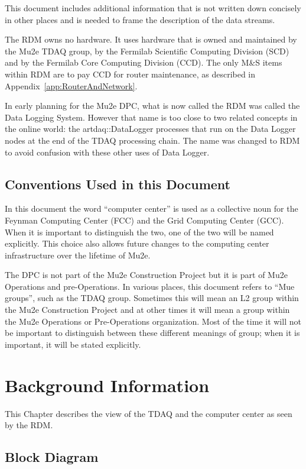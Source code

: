 This document includes additional information that is not written down concisely
in other places and is needed to frame the description of the data streams.


The RDM owns no hardware.  It uses hardware that is owned and maintained
by the Mu2e TDAQ group,
by the Fermilab Scientific Computing Division (SCD)
and by the Fermilab Core Computing Division (CCD).
The only M\&S items within RDM are to pay CCD for router maintenance,
as described in Appendix~\ref{app:RouterAndNetwork}.

In early planning for the Mu2e DPC, what is now called the RDM was called the Data Logging System.
However that name is too close to two related concepts in the online world:
the {\code artdaq::DataLogger} processes that run on the Data Logger nodes at the end of the TDAQ
processing chain.  The name was changed to RDM to avoid confusion with these other uses of Data Logger.

\section{Conventions Used in this Document}

In this document the word ``computer center'' is used as a collective noun for the
Feynman Computing Center (FCC) and the Grid Computing Center (GCC).
When it is important to distinguish the two, one of the two will be named explicitly.
This choice also allows future changes to the computing center infrastructure over the
lifetime of Mu2e.

The DPC is not part of the Mu2e Construction Project but it is part of Mu2e Operations
and pre-Operations.
In various places, this document refers to ``Mue groups'', such as the TDAQ group.
Sometimes this will mean an L2 group within the Mu2e Construction Project and at other
times it will mean a group within the Mu2e Operations or Pre-Operations organization.
Most of the time it will not be important to distinguish between these different meanings
of group; when it is important, it will be stated explicitly.


\chapter{Background Information}
\label{chap:BackgroundInfo}
This Chapter describes the view of the TDAQ and the computer center as seen by the RDM.

\section{Block Diagram}
\label{sec:BlockDiagram}

